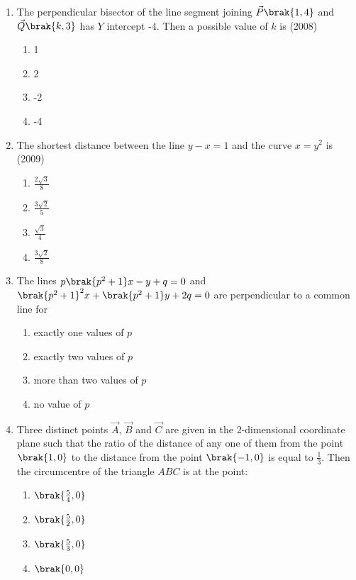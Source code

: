 \begin{enumerate}[label=\thesubsection.\arabic*.,ref=\thesubsection.\theenumi]
\begin{multicols}{4}
\begin{enumerate}
\item -2
\end{enumerate}
\end{multicols}
%
\item The perpendicular bisector of the line segment joining $\vec{P}\brak{1,4}$ and $\vec{Q}\brak{k, 3}$ has $Y$ intercept -4. Then a possible value of $k$ is \hfill{(2008)}
\begin{multicols}{4}
\begin{enumerate}
\item 1
\item 2
\item -2
\item -4
\end{enumerate}
\end{multicols} 
%
\item The shortest distance between the line $y- x =1$ and the 
	curve $x=y^{2}$ is \hfill{(2009)}
\begin{multicols}{4}
\begin{enumerate}
\item $\frac{2\sqrt{3}}{8}$
\item $\frac{3\sqrt{2}}{5}$
\item $\frac{\sqrt{3}}{4}$
\item $\frac{3\sqrt{2}}{8}$
\end{enumerate}
\end{multicols}
%
\item The lines $p\brak{p^{2}+1}x-y+q=0$ and $\brak{p^{2}+1}^{2}x+\brak{p^{2}+1}y+ 2q=0$ are perpendicular to a common line for  \hfill {}
\begin{multicols}{2}
\begin{enumerate}
\item exactly one values of $p$
\item exactly two values of $p$ 
\item more than two values of $p$ 
\item no value of $p$ 
\end{enumerate}
\end{multicols}
%
\item Three distinct points $\vec{A}$, $\vec{B}$ and $\vec{C}$ are given in the 
2-dimensional coordinate plane such that the ratio of the 
distance of any one of them from the point $\brak{1, 0}$ to the distance from
the point $\brak{-1, 0}$ is equal to $\frac{1}{3}$. Then the circumcentre of the triangle $ABC$ is at the point: \hfill {}
\begin{multicols}{4}
\begin{enumerate}
\item $\brak{\frac{5}{4}, 0}$
\item $\brak{\frac{5}{2}, 0}$
\item $\brak{\frac{5}{3}, 0}$
\item $\brak{0, 0}$
\end{enumerate}
\end{multicols} 


\end{enumerate}
